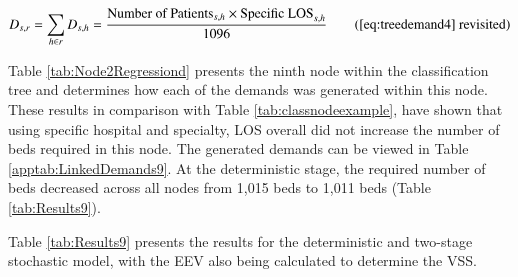 \documentclass[../thesis.tex]{subfiles}
\begin{document}
\begin{equation}
        D_{s,r} = \sum\limits_{h \in r} D_{s,h} = \frac{\text{Number of Patients}_{s,h}\times{\text{Specific LOS}_{s,h}}}{1096} \tag{\ref{eq:treedemand4} revisited}
\end{equation}

Table \ref{tab:Node2Regressiond} presents the ninth node within the classification tree and determines how each of the demands was generated within this node. These results in comparison with Table \ref{tab:classnodeexample}, have shown that using specific hospital and specialty, LOS overall did not increase the number of beds required in this node. The generated demands can be viewed in Table \ref{apptab:LinkedDemands9}. At the deterministic stage, the required number of beds decreased across all nodes from 1,015 beds to 1,011 beds (Table \ref{tab:Results9}). 

\begin{table}[h!]
    \centering{}
    \caption{The count of admissions and the associated specific LOS for each hospital and specialty within the ninth node of the classification tree. The average daily bed demand has additionally been calculated.}
    \label{tab:Node2Regressiond}
\end{table}

Table \ref{tab:Results9} presents the results for the deterministic and two-stage stochastic model, with the EEV also being calculated to determine the VSS.
\end{document}
